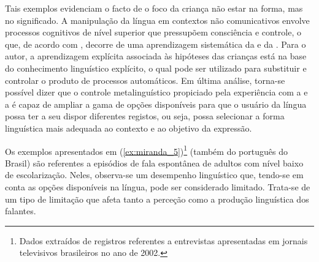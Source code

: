 \documentclass[output=paper]{LSP/langsci}
\begin{document}
Tais exemplos evidenciam o facto de o foco da criança não estar na forma, mas no significado. A manipulação da língua em contextos não comunicativos envolve processos cognitivos de nível superior que pressupõem consciência e controle, o que, de acordo com \citet{gombert2003}, decorre de uma aprendizagem sistemática da  e da . Para o autor, a aprendizagem explícita associada às hipóteses das crianças está na base do conhecimento linguístico explícito, o qual pode ser utilizado para substituir e controlar o produto de processos automáticos. Em última análise, torna-se possível dizer que o controle metalinguístico propiciado pela experiência com a  e a  é capaz de ampliar a gama de opções disponíveis para que o usuário da língua possa ter a seu dispor diferentes registos, ou seja, possa selecionar a forma linguística mais adequada ao contexto e ao objetivo da expressão. 

Os exemplos apresentados em (\ref{ex:miranda_5})\footnote{Dados extraídos de registros referentes a entrevistas apresentadas em jornais televisivos brasileiros no ano de 2002.} (também do português do Brasil) são referentes a episódios de fala espontânea de adultos com nível baixo de escolarização. Neles, observa-se um desempenho linguístico que, tendo-se em conta as opções disponíveis na língua, pode ser considerado limitado. Trata-se de um tipo de limitação que afeta tanto a perceção como a produção linguística dos falantes.

\ea\label{ex:miranda_5}
\z
\z
\end{document}
